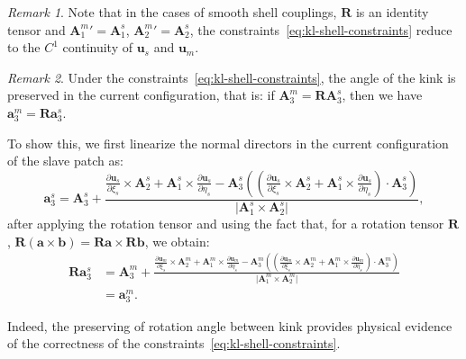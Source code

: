 \documentclass[preprint,12pt]{elsarticle}
\theoremstyle{remark}
\newtheorem{remark}{Remark}
\begin{document}
\begin{remark}
    Note that in the cases of smooth shell couplings, $\mathbf{R}$ is an identity tensor and ${\mathbf{A}_1^m}'={\mathbf{A}_1^s}$, ${\mathbf{A}_2^m}'={\mathbf{A}_2^s}$, the constraints~\eqref{eq:kl-shell-constraints} reduce to the $C^1$ continuity of $\mathbf{u}_s$ and $\mathbf{u}_m$.
\end{remark}
\begin{remark}
    Under the constraints~\eqref{eq:kl-shell-constraints}, the angle of the kink is preserved in the current configuration, that is: if $\mathbf{A}_3^m=\mathbf{R}\mathbf{A}_3^s$, then we have $\mathbf{a}_3^m=\mathbf{R}\mathbf{a}_3^s$.\par

    To show this, we first linearize the normal directors in the current configuration of the slave patch as:
    \begin{equation}
        \mathbf{a}_3^s=\mathbf{A}_3^s+\frac{\frac{\partial\mathbf{u}_s}{\partial{\xi_s}}\times\mathbf{A}_2^s+\mathbf{A}_1^s\times\frac{\partial\mathbf{u}_s}{\partial{\eta_s}}-\mathbf{A}_3^s\left(\left({\frac{\partial\mathbf{u}_s}{\partial{\xi_s}}\times\mathbf{A}_2^s+\mathbf{A}_1^s\times\frac{\partial\mathbf{u}_s}{\partial{\eta_s}}}\right)\cdot\mathbf{A}_3^s\right)}{\vert{\mathbf{A}_1^s\times\mathbf{A}_2^s}\vert},
    \end{equation}
    after applying the rotation tensor and using the fact that, for a rotation tensor $\mathbf{R}$, $\mathbf{R}(\mathbf{a}\times\mathbf{b})=\mathbf{R}\mathbf{a}\times\mathbf{R}\mathbf{b}$, we obtain:
    \begin{equation}
        \begin{split}
            \mathbf{R}\mathbf{a}_3^s&=\mathbf{A}_3^m+\frac{\frac{\partial\mathbf{u}_m}{\partial{\xi_s}}\times\mathbf{A}_2^m+\mathbf{A}_1^m\times\frac{\partial\mathbf{u}_m}{\partial{\eta_s}}-\mathbf{A}_3^m\left(\left({\frac{\partial\mathbf{u}_m}{\partial{\xi_s}}\times\mathbf{A}_2^m+\mathbf{A}_1^m\times\frac{\partial\mathbf{u}_m}{\partial{\eta_s}}}\right)\cdot\mathbf{A}_3^m\right)}{\vert{\mathbf{A}_1^m\times\mathbf{A}_2^m}\vert}\\
            &=\mathbf{a}_3^m.
        \end{split}
    \end{equation}
\end{remark}

Indeed, the preserving of rotation angle between kink provides physical evidence of the correctness of the constraints~\eqref{eq:kl-shell-constraints}.
\end{document}
